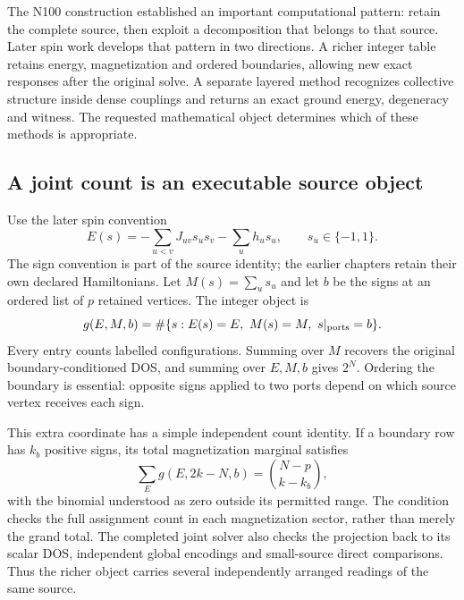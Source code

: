 \label{v3-exact-joint}

The N100 construction established an important computational pattern: retain the complete source, then exploit a decomposition that belongs to that source. Later spin work develops that pattern in two directions. A richer integer table retains energy, magnetization and ordered boundaries, allowing new exact responses after the original solve. A separate layered method recognizes collective structure inside dense couplings and returns an exact ground energy, degeneracy and witness. The requested mathematical object determines which of these methods is appropriate.

\subsection{A joint count is an executable source object}

Use the later spin convention
\begin{equation}
 E(s)=-\sum_{u<v}J_{uv}s_us_v-\sum_u h_us_u,
 \qquad s_u\in\{-1,1\}.
\end{equation}
The sign convention is part of the source identity; the earlier chapters retain their own declared Hamiltonians. Let $M(s)=\sum_us_u$ and let $b$ be the signs at an ordered list of $p$ retained vertices. The integer object is
\begin{equation}
 g(E,M,b)=\#\{s:E(s)=E,\ M(s)=M,\ s|_{\rm ports}=b\}.
\end{equation}
Every entry counts labelled configurations. Summing over $M$ recovers the original boundary-conditioned DOS, and summing over $E,M,b$ gives $2^N$. Ordering the boundary is essential: opposite signs applied to two ports depend on which source vertex receives each sign.

This extra coordinate has a simple independent count identity. If a boundary row has $k_b$ positive signs, its total magnetization marginal satisfies
\begin{equation}
 \sum_Eg(E,2k-N,b)=\binom{N-p}{k-k_b},
\end{equation}
with the binomial understood as zero outside its permitted range. The condition checks the full assignment count in each magnetization sector, rather than merely the grand total. The completed joint solver also checks the projection back to its scalar DOS, independent global encodings and small-source direct comparisons. Thus the richer object carries several independently arranged readings of the same source.

